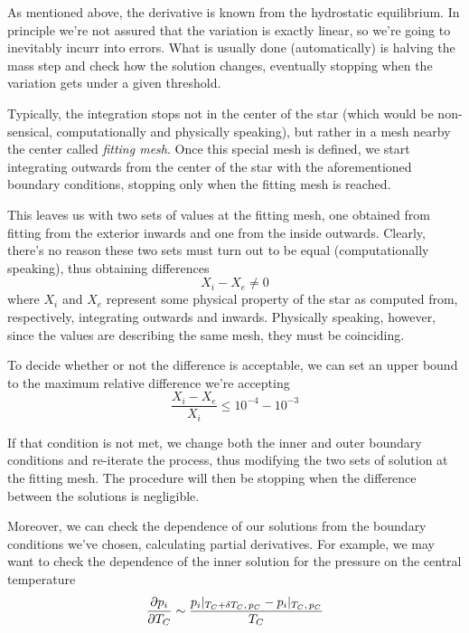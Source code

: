 As mentioned above, the derivative is known from the hydrostatic equilibrium. In principle we're not assured that the variation is exactly linear, so we're going to inevitably incurr into errors. What is usually done (automatically) is halving the mass step and check how the solution changes, eventually stopping when the variation gets under a given threshold.
\par Typically, the integration stops not in the center of the star (which would be non-sensical, computationally and physically speaking), but rather in a mesh nearby the center called \emph{fitting mesh}. Once this special mesh is defined, we start integrating outwards from the center of the star with the aforementioned boundary conditions, stopping only when the fitting mesh is reached.
\par This leaves us with two sets of values at the fitting mesh, one obtained from fitting from the exterior inwards and one from the inside outwards. Clearly, there's no reason these two sets must turn out to be equal (computationally speaking), thus obtaining differences
\begin{equation*}
    X_{i}-X_{e} \neq 0
\end{equation*}
where $X_{i}$ and $X_{e}$ represent some physical property of the star as computed from, respectively, integrating outwards and inwards. Physically speaking, however, since the values are describing the same mesh, they must be coinciding.
\par To decide whether or not the difference is acceptable, we can set an upper bound to the maximum relative difference we're accepting
\begin{equation*}
    \frac{X_{i}-X_{e}}{X_{i}} \leq 10^{-4}-10^{-3}
\end{equation*}
\par If that condition is not met, we change both the inner and outer boundary conditions and re-iterate the process, thus modifying the two sets of solution at the fitting mesh. The procedure will then be stopping when the difference between the solutions is negligible.
\par Moreover, we can check the dependence of our solutions from the boundary conditions we've chosen, calculating partial derivatives. For example, we may want to check the dependence of the inner solution for the pressure on the central temperature
\begin{equation*}
    \frac{\partial p_{i}}{\partial T_{C}} \sim \frac{p_{i}|_{T_{C}+\delta T_{C},\,p_{C}}-p_{i}|_{T_{C},\,p_{C}}}{T_{C}}
\end{equation*}
